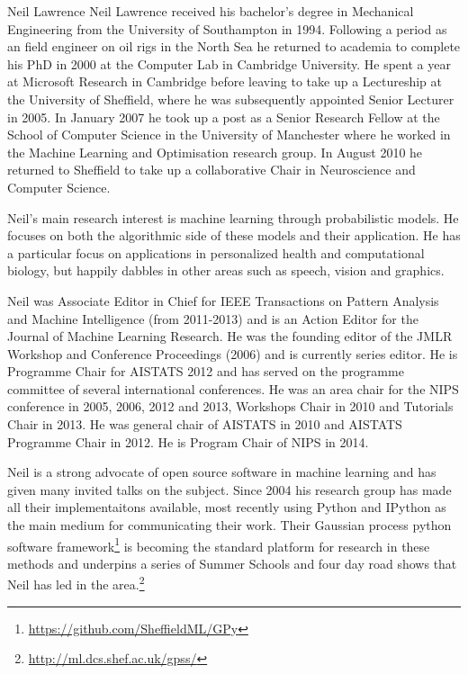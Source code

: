\begin{picv}[PM=6,salary=10000]{Neil Lawrence}
  Neil Lawrence received his bachelor's degree in Mechanical Engineering from the
  University of Southampton in 1994. Following a period as an field engineer on oil rigs
  in the North Sea he returned to academia to complete his PhD in 2000 at the Computer Lab
  in Cambridge University. He spent a year at Microsoft Research in Cambridge before
  leaving to take up a Lectureship at the University of Sheffield, where he was
  subsequently appointed Senior Lecturer in 2005. In January 2007 he took up a post as a
  Senior Research Fellow at the School of Computer Science in the University of Manchester
  where he worked in the Machine Learning and Optimisation research group. In August 2010
  he returned to Sheffield to take up a collaborative Chair in Neuroscience and Computer
  Science.

  Neil's main research interest is machine learning through probabilistic models. He
  focuses on both the algorithmic side of these models and their application. He has a
  particular focus on applications in personalized health and computational biology, but
  happily dabbles in other areas such as speech, vision and graphics.

  Neil was Associate Editor in Chief for IEEE Transactions on Pattern Analysis and Machine
  Intelligence (from 2011-2013) and is an Action Editor for the Journal of Machine
  Learning Research. He was the founding editor of the JMLR Workshop and Conference
  Proceedings (2006) and is currently series editor. He is Programme Chair for AISTATS
  2012 and has served on the programme committee of several international conferences. He
  was an area chair for the NIPS conference in 2005, 2006, 2012 and 2013, Workshops Chair
  in 2010 and Tutorials Chair in 2013. He was general chair of AISTATS in 2010 and AISTATS
  Programme Chair in 2012. He is Program Chair of NIPS in 2014.

  Neil is a strong advocate of open source software in machine learning and has given many
  invited talks on the subject. Since 2004 his research group has made all their
  implementaitons available, most recently using Python and IPython as the main medium for
  communicating their work. Their Gaussian process python software
  framework\footnote{\url{https://github.com/SheffieldML/GPy}} is becoming the standard
  platform for research in these methods and underpins a series of Summer Schools and four
  day road shows that Neil has led in the
  area.\footnote{\url{http://ml.dcs.shef.ac.uk/gpss/}}
\end{picv}
